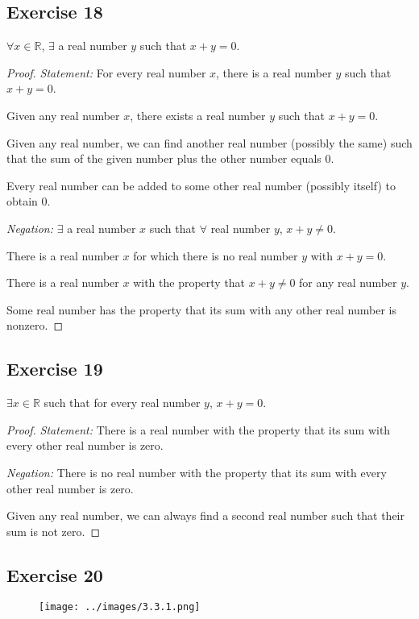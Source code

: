 \documentclass[14pt]{extarticle}
\newcommand{\R}{\mathbb{R}}
\newcommand{\fa}{\forall}
\newcommand{\te}{\exists}
\begin{document}
\subsection{Exercise 18}
$\fa x \in \R$, $\te$ a real number $y$ such that $x + y = 0$.

\begin{proof}
    {\it Statement:}
    For every real number $x$, there is a real number $y$ such that $x + y = 0$.

    Given any real number $x$, there exists a real number $y$ such that $x + y = 0$.

    Given any real number, we can find another real number (possibly the same) such that the sum of the given number plus the other number equals 0.

    Every real number can be added to some other real number (possibly itself) to obtain 0.

        {\it Negation:} $\te$ a real number $x$ such that $\fa$ real number $y$, $x + y \neq 0$.

    There is a real number $x$ for which there is no real number $y$ with $x + y = 0$.

    There is a real number $x$ with the property that $x + y \neq 0$ for any real number $y$.

    Some real number has the property that its sum with any other real number is nonzero.
\end{proof}

\subsection{Exercise 19}
$\te x \in \R$ such that for every real number $y$, $x + y = 0$.

\begin{proof}
    {\it Statement:} There is a real number with the property that its sum with every other real number is zero.

        {\it Negation:} There is no real number with the property that its sum with every other real number is zero.

    Given any real number, we can always find a second real number such that their sum is not zero.
\end{proof}

\subsection{Exercise 20}
\begin{figure}[ht!]
    \centering
    \texttt{[image: ../images/3.3.1.png]}
\end{figure}
\end{document}
